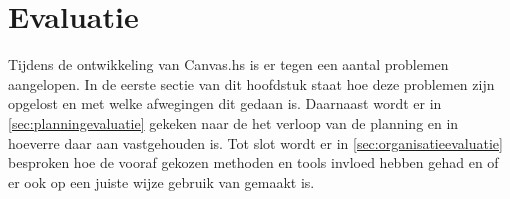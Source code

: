 \chapter{Evaluatie} \label{hoofdstuk:evaluatie}
Tijdens de ontwikkeling van Canvas.hs is er tegen een aantal problemen aangelopen. In de eerste sectie van dit hoofdstuk staat hoe deze problemen zijn opgelost en met welke afwegingen dit gedaan is. Daarnaast wordt er in \autoref{sec:planningevaluatie} gekeken naar de het verloop van de planning en in hoeverre daar aan vastgehouden is. Tot slot wordt er in \autoref{sec:organisatieevaluatie} besproken hoe de vooraf gekozen methoden en tools invloed hebben gehad en of er ook op een juiste wijze gebruik van gemaakt is.




